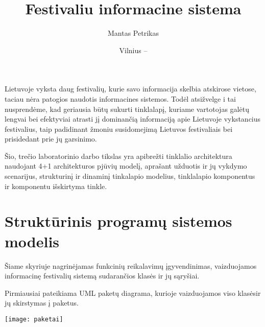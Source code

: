 ﻿\documentclass{VUMIFPSkursinis}
\title{Festivaliu informacine sistema}
\author{Mantas Petrikas}
\date{Vilnius – \the\year}
\begin{document}
\maketitle

\tableofcontents


Lietuvoje vyksta daug festivalių, kurie savo informacija skelbia atskirose vietose, taciau nėra patogios naudotis informacines sistemos. 
Todėl atsižvelge i tai nusprendėme, kad geriausia būtų sukurti tinklalapį, kuriame vartotojas galėtų lengvai bei efektyviai atrasti jį dominančią informaciją apie Lietuvoje vykstancius festivalius, taip padidinant žmoniu susidomejimą Lietuvos festivaliais bei prisidedant prie jų garsinimo.

Šio, trečio laboratorinio darbo tikslas yra apibrežti tinklalio architektura naudojant 4+1 architekturos pjūvių modelį, aprašant užduotis ir jų vykdymo scenarijus, strukturinį ir dinaminį tinkalapio modelius, tinklalapio komponentus ir komponentu išskirtyma tinkle.  


\section{Struktūrinis programų sistemos modelis}
Šiame skyriuje nagrinėjamas funkcinių reikalavimų įgyvendinimas, vaizduojamos informacinę festivalių sistemą sudarančios klasės ir jų sąryšiai.

Pirmiausiai pateikiama UML paketų diagrama, kurioje vaizduojamos viso klasėsir jų skirstymas į paketus.
\begin{center}
    \texttt{[image: paketai]}
\end{center}
\end{document}
